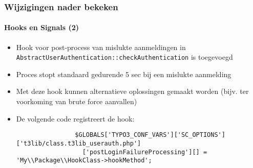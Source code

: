 \begin{frame}[fragile]
	\frametitle{Wijzigingen nader bekeken}
	\framesubtitle{Hooks en Signals (2)}

	\lstset{basicstyle=\tiny\ttfamily}

	\begin{itemize}

		\item Hook voor post-process van mislukte aanmeldingen in \texttt{AbstractUserAuthentication::checkAuthentication}
			is toegevoegd

		\item Proces stopt standaard gedurende 5 sec bij een mislukte aanmelding

		\item Met deze hook kunnen alternatieve oplossingen gemaakt worden
			(bijv. ter voorkoming van brute force aanvallen)

		\item De volgende code registreert de hook:

			\begin{lstlisting}
				$GLOBALS['TYPO3_CONF_VARS']['SC_OPTIONS']['t3lib/class.t3lib_userauth.php']
				  ['postLoginFailureProcessing'][] = 'My\\Package\\HookClass->hookMethod';
			\end{lstlisting}

	\end{itemize}

\end{frame}


